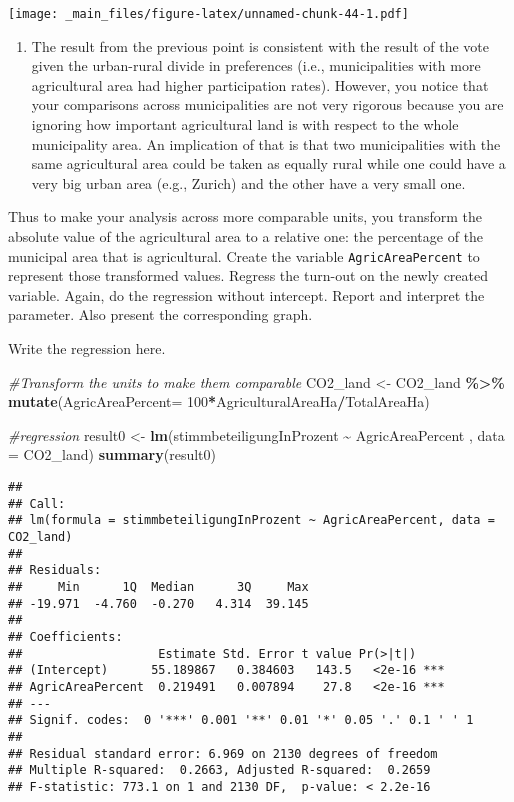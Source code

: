 \documentclass[
]{book}
\newenvironment{Shaded}{\begin{snugshade}}{\end{snugshade}}
\newcommand{\AttributeTok}[1]{\textcolor[rgb]{0.13,0.29,0.53}{#1}}
\newcommand{\CommentTok}[1]{\textcolor[rgb]{0.56,0.35,0.01}{\textit{#1}}}
\newcommand{\DecValTok}[1]{\textcolor[rgb]{0.00,0.00,0.81}{#1}}
\newcommand{\FunctionTok}[1]{\textcolor[rgb]{0.13,0.29,0.53}{\textbf{#1}}}
\newcommand{\NormalTok}[1]{#1}
\newcommand{\OtherTok}[1]{\textcolor[rgb]{0.56,0.35,0.01}{#1}}
\newcommand{\SpecialCharTok}[1]{\textcolor[rgb]{0.81,0.36,0.00}{\textbf{#1}}}
\providecommand{\tightlist}{%
  \setlength{\itemsep}{0pt}\setlength{\parskip}{0pt}}
\begin{document}
\texttt{[image: \_main\_files/figure-latex/unnamed-chunk-44-1.pdf]}

\begin{enumerate}
\def\labelenumi{\roman{enumi}.}
\setcounter{enumi}{8}
\tightlist
\item
  The result from the previous point is consistent with the result of the vote given the urban-rural divide in preferences (i.e., municipalities with more agricultural area had higher participation rates). However, you notice that your comparisons across municipalities are not very rigorous because you are ignoring how important agricultural land is with respect to the whole municipality area. An implication of that is that two municipalities with the same agricultural area could be taken as equally rural while one could have a very big urban area (e.g., Zurich) and the other have a very small one.
\end{enumerate}

Thus to make your analysis across more comparable units, you transform the absolute value of the agricultural area to a relative one: the percentage of the municipal area that is agricultural. Create the variable \texttt{AgricAreaPercent} to represent those transformed values. Regress the turn-out on the newly created variable. Again, do the regression without intercept. Report and interpret the parameter. Also present the corresponding graph.

Write the regression here.

\begin{Shaded}
\begin{Highlighting}[]
\CommentTok{\#Transform the units to make them comparable }
\NormalTok{CO2\_land }\OtherTok{\textless{}{-}}\NormalTok{ CO2\_land }\SpecialCharTok{\%\textgreater{}\%}
  \FunctionTok{mutate}\NormalTok{(}\AttributeTok{AgricAreaPercent=} \DecValTok{100}\SpecialCharTok{*}\NormalTok{AgriculturalAreaHa}\SpecialCharTok{/}\NormalTok{TotalAreaHa)}

\CommentTok{\#regression}
\NormalTok{result0 }\OtherTok{\textless{}{-}} \FunctionTok{lm}\NormalTok{(stimmbeteiligungInProzent }\SpecialCharTok{\textasciitilde{}}\NormalTok{ AgricAreaPercent , }\AttributeTok{data =}\NormalTok{ CO2\_land)}
\FunctionTok{summary}\NormalTok{(result0)}
\end{Highlighting}
\end{Shaded}

\begin{verbatim}
## 
## Call:
## lm(formula = stimmbeteiligungInProzent ~ AgricAreaPercent, data = CO2_land)
## 
## Residuals:
##     Min      1Q  Median      3Q     Max 
## -19.971  -4.760  -0.270   4.314  39.145 
## 
## Coefficients:
##                   Estimate Std. Error t value Pr(>|t|)    
## (Intercept)      55.189867   0.384603   143.5   <2e-16 ***
## AgricAreaPercent  0.219491   0.007894    27.8   <2e-16 ***
## ---
## Signif. codes:  0 '***' 0.001 '**' 0.01 '*' 0.05 '.' 0.1 ' ' 1
## 
## Residual standard error: 6.969 on 2130 degrees of freedom
## Multiple R-squared:  0.2663, Adjusted R-squared:  0.2659 
## F-statistic: 773.1 on 1 and 2130 DF,  p-value: < 2.2e-16
\end{verbatim}
\end{document}
